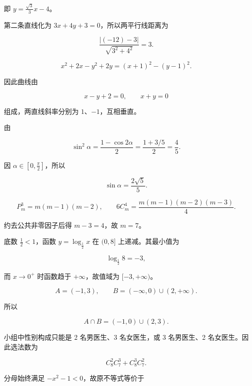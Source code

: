 \begin{answer}
即 $y=\frac{\sqrt3}{3}x-4$。


第二条直线化为 $3x+4y+3=0$，所以两平行线距离为

\nopagebreak[4]
\[
\frac{|(-12)-3|}{\sqrt{3^2+4^2}}=3.
\]


\nopagebreak[4]
\[
x^2+2x-y^2+2y=(x+1)^2-(y-1)^2.
\]

因此曲线由

\nopagebreak[4]
\[
x-y+2=0,\qquad x+y=0
\]

组成，两直线斜率分别为 $1$、$-1$，互相垂直。


由

\nopagebreak[4]
\[
\sin^2\alpha=\frac{1-\cos2\alpha}{2}
=\frac{1+3/5}{2}=\frac45.
\]

因 $\alpha\in[0,\frac\pi2]$，所以

\nopagebreak[4]
\[
\sin\alpha=\frac{2\sqrt5}{5}.
\]


\nopagebreak[4]
\[
P_m^3=m(m-1)(m-2),\qquad
6C_m^4=\frac{m(m-1)(m-2)(m-3)}4.
\]

约去公共非零因子后得 $m-3=4$，故 $m=7$。


底数 $\frac12<1$，函数 $y=\log_{\frac12}x$ 在 $(0,8]$ 上递减。其最小值为

\nopagebreak[4]
\[
\log_{\frac12}8=-3,
\]

而 $x\to0^+$ 时函数趋于 $+\infty$，故值域为 $[-3,+\infty)$。


\nopagebreak[4]
\[
A=(-1,3),
\qquad
B=(-\infty,0)\cup(2,+\infty).
\]

所以

\nopagebreak[4]
\[
A\cap B=(-1,0)\cup(2,3).
\]


小组中性别构成只能是 2 名男医生、3 名女医生，或 3 名男医生、2 名女医生。因此选法数为

\nopagebreak[4]
\[
C_8^2C_7^3+C_8^3C_7^2.
\]


分母始终满足 $-x^2-1<0$，故原不等式等价于


\end{answer}
